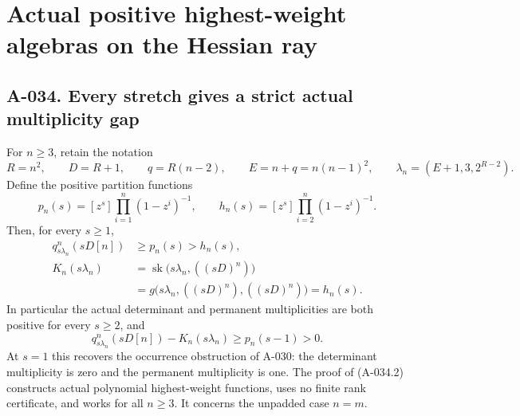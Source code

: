 \section{Actual positive highest-weight algebras on the Hessian ray}

\subsection*{A-034. Every stretch gives a strict actual multiplicity gap}
For \(n\geq3\), retain the notation
\[
 R=n^2,\qquad D=R+1,\qquad q=R(n-2),\qquad
 E=n+q=n(n-1)^2,\qquad
 \lambda_n=(E+1,3,2^{R-2}).
\]
Define the positive partition functions
\[
 p_n(s)=[z^s]\prod_{i=1}^n(1-z^i)^{-1},
 \qquad
 h_n(s)=[z^s]\prod_{i=2}^n(1-z^i)^{-1}.
                                                               \tag{A-034.1}
\]
Then, for every \(s\geq1\),
\[
 \boxed{\begin{aligned}
 q^n_{s\lambda_n}(sD[n])&\geq p_n(s)>h_n(s),\\
 K_n(s\lambda_n)
 &=\operatorname{sk}\bigl(s\lambda_n,((sD)^n)\bigr)\\
 &=g\bigl(s\lambda_n,((sD)^n),((sD)^n)\bigr)=h_n(s).
 \end{aligned}}                                                \tag{A-034.2}
\]
In particular the actual determinant and permanent
multiplicities are both positive for every \(s\geq2\), and
\[
 q^n_{s\lambda_n}(sD[n])-K_n(s\lambda_n)
                         \geq p_n(s-1)>0.                       \tag{A-034.3}
\]
At \(s=1\) this recovers the occurrence obstruction of A-030:
the determinant multiplicity is zero and the permanent
multiplicity is one. The proof of (A-034.2) constructs actual
polynomial highest-weight functions, uses no finite rank
certificate, and works for all \(n\geq3\).
It concerns the unpadded case \(n=m\).

